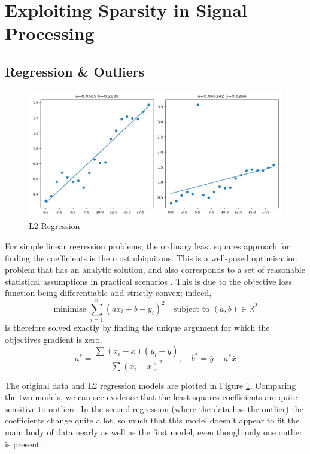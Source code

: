 \documentclass[12pt]{article}
\begin{document}
\section{Exploiting Sparsity in Signal Processing}

\subsection{Regression \& Outliers}

\begin{figure}[htp]
    \includegraphics[scale=0.5, center]{figures/regression_l2.png}
    \caption{L2 Regression}
    \label{fig:regression_l2}
\end{figure}

For simple linear regression problems, the ordinary least squares approach for finding the coefficients is the most ubiquitous.
This is a well-posed optimisation problem that has an analytic solution, and also corresponds to a set of reasonable statistical assumptions in practical scenarios \cite{islp}.
This is due to the objective loss function being differentiable and strictly convex; indeed,
\[\text{minimise } \sum_{i=1}^{n}{(ax_i+b-y_i)^2} \quad \text{subject to } (a, b)\in\mathbb{R}^2\]
is therefore solved exactly by finding the unique argument for which the objectives gradient is zero,
\[a^*=\frac{\sum (x_i-\bar{x}) (y_i-\bar{y})}{\sum (x_i-\bar{x})^2},\quad b^*=\bar{y} - a^*\bar{x}\]

The original data and L2 regression models are plotted in Figure \ref{fig:regression_l2}.
Comparing the two models, we can see evidence that the least squares coefficients are quite sensitive to outliers.
In the second regression (where the data has the outlier) the coefficients change quite a lot,
so much that this model doesn't appear to fit the main body of data nearly as well as the first model,
even though only one outlier is present.
\end{document}
